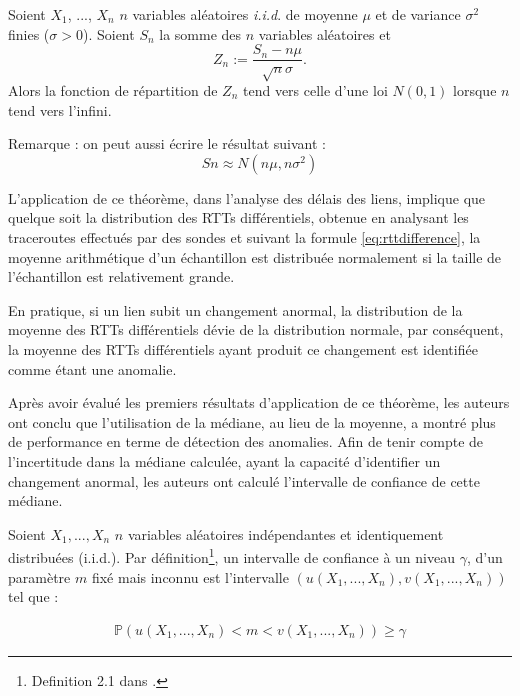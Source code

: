 \begin{tcolorbox}
	Soient $X_1$, ..., $X_n$ $n$ variables aléatoires \textit{i.i.d}. de moyenne $\mu$ et de variance $\sigma^2$ finies ($\sigma > 0$). Soient $S_n$ la somme des $n$ variables aléatoires et 
	\begin{equation}
	Z_n := \frac{S_n - n\mu}{\sqrt{n} \sigma}.
	\end{equation} 
	Alors la fonction de répartition de $Z_n$ tend vers celle d'une loi $N(0,1)$ lorsque $n$ tend vers l'infini.
	
	Remarque : on peut aussi écrire le résultat suivant :
	\begin{equation}
	Sn \approx N(n\mu, n\sigma^2)
	\end{equation}
\end{tcolorbox}

L'application de ce théorème, dans  l'analyse des délais des liens, implique que quelque soit la distribution des RTTs différentiels, obtenue en analysant les traceroutes effectués par des sondes et suivant la formule \ref{eq:rttdifference}, la moyenne arithmétique d'un échantillon  est distribuée normalement si la taille de l'échantillon est relativement grande. 

En pratique,
si un lien subit un changement anormal, la distribution de la moyenne des RTTs différentiels dévie de la distribution normale, par conséquent, la moyenne des RTTs différentiels ayant produit ce changement est identifiée comme  étant une anomalie.




Après avoir évalué les premiers résultats d'application de ce théorème, les auteurs ont conclu que l'utilisation de la médiane,  au lieu de la moyenne, a montré plus de performance en terme de détection des anomalies.
Afin de tenir compte de l'incertitude dans la médiane calculée, ayant la capacité d'identifier un changement anormal, les auteurs ont  calculé  l'intervalle de confiance de cette médiane.

Soient $X_1,...,X_n$ $n$ variables aléatoires indépendantes et identiquement distribuées (i.i.d.).
Par définition\footnote{Definition 2.1 dans \cite{leboudec2010performance}.},  un intervalle de confiance à un niveau $\gamma$,  d'un paramètre $m$ fixé mais inconnu est l'intervalle  $(u(X_1,...,X_n),v(X_1,...,X_n)) $ tel que  :

\begin{align}
\mathbb{P}(u(X_1,...,X_n)< m< v(X_1,...,X_n)) \geq \gamma
\end{align}


